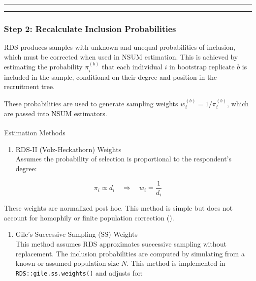 \documentclass[
  12pt,
  letterpaper,
  DIV=11,
  numbers=noendperiod]{scrartcl}
\makeatletter
\let\oldparagraph\paragraph
\renewcommand{\paragraph}{
    \@ifstar
      \xxxParagraphStar
      \xxxParagraphNoStar
  }
\newcommand{\xxxParagraphStar}[1]{\oldparagraph*{#1}\mbox{}}
\newcommand{\xxxParagraphNoStar}[1]{\oldparagraph{#1}\mbox{}}
\providecommand{\tightlist}{%
  \setlength{\itemsep}{0pt}\setlength{\parskip}{0pt}}
\theoremstyle{plain}
\theoremstyle{definition}
\makeatother
\begin{document}
\begin{center}\rule{0.5\linewidth}{0.5pt}\end{center}

\begin{center}\rule{0.5\linewidth}{0.5pt}\end{center}

\subsubsection{Step 2: Recalculate Inclusion
Probabilities}\label{step-2-recalculate-inclusion-probabilities}

RDS produces samples with unknown and unequal probabilities of
inclusion, which must be corrected when used in NSUM estimation. This is
achieved by estimating the probability \(\pi_i^{(b)}\) that each
individual \(i\) in bootstrap replicate \(b\) is included in the sample,
conditional on their degree and position in the recruitment tree.

These probabilities are used to generate sampling weights
\(w_i^{(b)} = 1/\pi_i^{(b)}\), which are passed into NSUM estimators.

\paragraph{Estimation Methods}\label{estimation-methods-1}

\begin{enumerate}
\def\labelenumi{(\alph{enumi})}
\tightlist
\item
  RDS-II (Volz-Heckathorn) Weights\\
  Assumes the probability of selection is proportional to the
  respondent's degree:
\end{enumerate}

\[\pi_i \propto d_i \quad \Rightarrow \quad w_i = \frac{1}{d_i}\]

These weights are normalized post hoc. This method is simple but does
not account for homophily or finite population correction
(\textcite{volz08-rds}).

\begin{enumerate}
\def\labelenumi{(\alph{enumi})}
\setcounter{enumi}{1}
\tightlist
\item
  Gile's Successive Sampling (SS) Weights\\
  This method assumes RDS approximates successive sampling without
  replacement. The inclusion probabilities are computed by simulating
  from a known or assumed population size \(N\). This method is
  implemented in \texttt{RDS::gile.ss.weights()} and adjusts for:
\end{enumerate}
\end{document}
